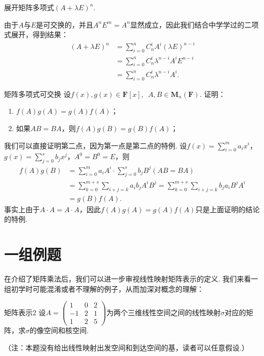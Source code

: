 \begin{example}{}{}
    展开矩阵多项式$(A+\lambda E)^n$.
\end{example}

\begin{solution}
    由于$A$与$E$是可交换的，并且$A^nE^m=A^n$显然成立，因此我们结合中学学过的二项式展开，得到结果：
    \begin{align*}
        (A+\lambda E)^n & =\sum_{i=0}^nC_n^iA^i(\lambda E)^{n-i}    \\
                        & =\sum_{i=0}^nC_n^i\lambda^{n-i}A^iE^{n-i} \\
                        & =\sum_{i=0}^nC_n^i\lambda^{n-i}A^i.
    \end{align*}
\end{solution}

\begin{example}{}{矩阵多项式可交换}
    设$f(x),g(x) \in \mathbf{F}[x],\enspace A,B \in \mathbf{M}_n(\mathbf{F})$. 证明：
    \begin{enumerate}
        \item $f(A)g(A)=g(A)f(A)$；

        \item 如果$AB=BA$，则$f(A)g(B)=g(B)f(A)$；
    \end{enumerate}
\end{example}

\begin{solution}
    我们可以直接证明第二点，因为第一点是第二点的特例. 设$f(x)=\displaystyle\sum_{i=0}^ma_ix^i$，$g(x)=\displaystyle\sum_{j=0}^sb_jx^j$，$A^0=B^0=E$，则
    \begin{align*}
        f(A)g(B) & =\sum_{i=0}^ma_iA^i\cdot \sum_{j=0}^sb_jB^j(AB=BA)                                 \\
                 & =\sum_{k=0}^{m+s}\sum_{i+j=k}a_ib_jA^iB^j=\sum_{k=0}^{m+s}\sum_{i+j=k}b_ja_iB^jA^i \\
                 & =g(B)f(A).
    \end{align*}
    事实上由于$A\cdot A=A\cdot A$，因此$f(A)g(A)=g(A)f(A)$只是上面证明的结论的特例.
\end{solution}

\section{一组例题}

在介绍了矩阵乘法后，我们可以进一步审视线性映射矩阵表示的定义. 我们来看一组初学时可能混淆或者不理解的例子，从而加深对概念的理解：
\begin{example}{}{矩阵表示2}
    设$A=\begin{pmatrix}1 & 0 & 2 \\ -1 & 2 & 1 \\ 1 & 2 & 5\end{pmatrix}$为两个三维线性空间之间的线性映射$\sigma$对应的矩阵，求$\sigma$的像空间和核空间.
\end{example}
（注：本题没有给出线性映射出发空间和到达空间的基，读者可以任意假设.）

